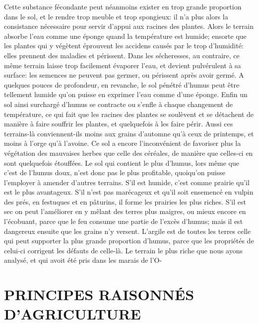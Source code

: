 Cette substance fécondante peut néanmoins exister en trop grande proportion dans le sol, et le rendre trop meuble et trop spongieux: il n'a plus alors la consistance nécessaire pour servir d'appui aux racines des plantes. Alors le terrain absorbe l'eau comme une éponge quand la température est humide; ensorte que les plantes qui y végètent éprouvent les accidens causés par le trop d'humidité: elles prennent des maladies et périssent. Dans les sécheresses, au contraire, ce même terrain laisse trop facilement évaporer l'eau, et devient pulvérulent à sa surface: les semences ne peuvent pas germer, ou périssent après avoir germé. A quelques pouces de profondeur, en revanche, le sol pénétré d'humus peut être tellement humide qu'on puisse en exprimer l'eau comme d'une éponge. Enfin un sol ainsi surchargé d'humus se contracte ou s'enfle à chaque changement de température, ce qui fait que les racines des plantes se\setcounter{page}{100} soulèvent et se détachent de manière à faire souffrir les plantes, et quelquefois à les faire périr. Aussi ces terrains-là conviennent-ils moins aux grains d'automne qu'à ceux de printemps, et moins à l'orge qu'à l'avoine. Ce sol a encore l'inconvénient de favoriser plus la végétation des mauvaises herbes que celle des céréales, de manière que celles-ci en sont quelquefois étouffées. Le sol qui contient le plus d'humus, lors même que c'est de l'humus doux, n'est donc pas le plus profitable, quoiqu'on puisse l'employer à amender d'autres terrains.
S'il est humide, c'est comme prairie qu'il est le plus avantageux. S'il n'est pas marécageux et qu'il soit ensemencé en vulpin des prés, en festuques et en pâturins, il forme les prairies les plus riches. S'il est sec on peut l'améliorer en y mêlant des terres plus maigres, ou mieux encore en l'écobuant, parce que le feu consume une partie de l'excès d'humus; mais il est dangereux ensuite que les grains n'y versent.
L'argile est de toutes les terres celle qui peut supporter la plus grande proportion d'humus, parce que les propriétés de celui-ci corrigent les défauts de celle-là. Le terrain le plus riche que nous ayons analysé, et qui avoit été pris dans les marais de l'O-\setcounter{page}{101} \section{PRINCIPES RAISONNÉS D'AGRICULTURE}
